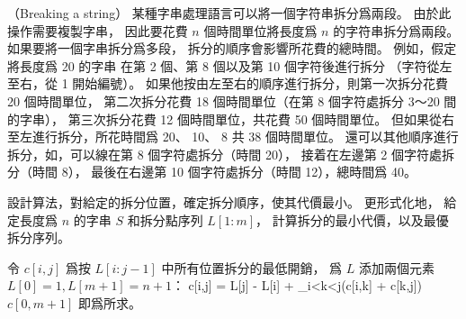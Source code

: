 \startPROBLEM
（Breaking a string）
某種字串處理語言可以將一個字符串拆分爲兩段。
由於此操作需要複製字串，
因此要花費 $n$ 個時間單位將長度爲 $n$ 的字符串拆分爲兩段。
如果要將一個字串拆分爲多段，
拆分的順序會影響所花費的總時間。
例如，假定將長度爲 20 的字串
在第 2 個、第 8 個以及第 10 個字符後進行拆分
（字符從左至右，從 1 開始編號）。
如果他按由左至右的順序進行拆分，則第一次拆分花費 20 個時間單位，
第二次拆分花費 18 個時間單位（在第 8 個字符處拆分 3～20 間的字串），
第三次拆分花費 12 個時間單位，共花費 50 個時間單位。
但如果從右至左進行拆分，所花時間爲 20、 10、 8 共 38 個時間單位。
還可以其他順序進行拆分，如，可以線在第 8 個字符處拆分（時間 20），
接着在左邊第 2 個字符處拆分（時間 8），
最後在右邊第 10 個字符處拆分（時間 12），總時間爲 40。

設計算法，對給定的拆分位置，確定拆分順序，使其代價最小。
更形式化地，
給定長度爲 $n$ 的字串 $S$ 和拆分點序列 $L[1:m]$，
計算拆分的最小代價，以及最優拆分序列。

\startANSWER
令 $c[i,j]$ 爲按 $L[i:j-1]$ 中所有位置拆分的最低開銷，
爲 $L$ 添加兩個元素 $L[0] = 1, L[m+1] = n+1$：
\startformula
c[i,j] = \startmathcases
\NC L[j] - L[i] + \min_{i<k<j}(c[i,k] + c[k,j]) \NC {} \NR
{} \NC {} \NR
\stopmathcases
\stopformula
$c[0,m+1]$ 即爲所求。
\stopANSWER

\stopPROBLEM
